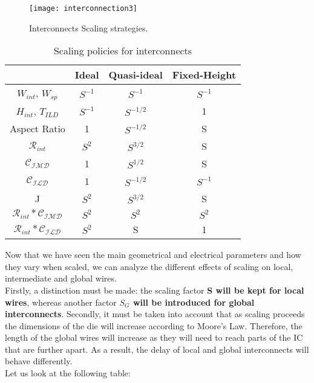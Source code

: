 \documentclass[a4paper, 12pt, twoside, openright]{report}
\begin{document}
	\begin{figure}[H]
	\centering
	\texttt{[image: interconnection3]}
	\caption{Interconnects Scaling strategies.}
	\label{figint2}
	\end{figure}

\begin{table}[H] {
\begin{center} {
\begin{tabular}{||c|c|c|c||}
\hline
&Ideal&Quasi-ideal&Fixed-Height\\
\hline
$W_{int}$, $W_{sp}$ & $S^{-1}$ & $S^{-1}$ & $S^{-1}$\\
\hline
$H_{int}$, $T_{ILD}$ & $S^{-1}$ & $S^{-1/2}$ & 1\\
\hline
Aspect Ratio & 1 & $S^{-1/2}$ & S\\
\hline
$\mathcal{R}_{int}$ & $S^{2}$ & $S^{3/2}$ & S\\
\hline
$\mathcal{C_{IMD}}$ & 1 & $S^{1/2}$ & S\\
\hline
$\mathcal{C_{ILD}}$ & 1 & $S^{-1/2}$ & $S^{-1}$\\
\hline
J & $S^{2}$ & $S^{3/2}$ & S\\
\hline
$\mathcal{R}_{int}*\mathcal{C_{IMD}}$ & $S^{2}$ & $S^{2}$ & $S^{2}$\\
\hline
$\mathcal{R}_{int}*\mathcal{C_{ILD}}$ & $S^{2}$ & S & 1\\
\hline
\end{tabular} }
\caption{Scaling policies for interconnects}
\end{center} }
\end{table}

Now that we have seen the main geometrical and electrical parameters and how they vary when scaled, we can analyze the different effects of scaling on local, intermediate and global wires.\\ Firstly, a distinction must be made: the scaling factor \textbf{S will be kept for local wires}, whereas another factor \textbf{$S_{G}$ will be introduced for global interconnects}. Secondly, it must be taken into account that as scaling proceeds the dimensions of the die will increase according to Moore's Law. Therefore, the length of the global wires will increase as they will need to reach parts of the IC that are further apart. As a result, the delay of local and global interconnects will behave differently.\\ Let us look at the following table:
\end{document}
